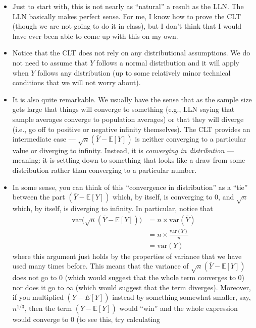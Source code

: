 \documentclass[
  letterpaper,
  DIV=11,
  numbers=noendperiod]{scrreprt}
\begin{document}
\begin{itemize}
\item
  Just to start with, this is not nearly as ``natural'' a result as the
  LLN. The LLN basically makes perfect sense. For me, I know how to
  prove the CLT (though we are not going to do it in class), but I don't
  think that I would have ever been able to come up with this on my own.
\item
  Notice that the CLT does not rely on any distributional assumptions.
  We do not need to assume that \(Y\) follows a normal distribution and
  it will apply when \(Y\) follows any distribution (up to some
  relatively minor technical conditions that we will not worry about).
\item
  It is also quite remarkable. We usually have the sense that as the
  sample size gets large that things will converge to something (e.g.,
  LLN saying that sample averages converge to population averages) or
  that they will diverge (i.e., go off to positive or negative infinity
  themselves). The CLT provides an intermediate case ---
  \(\sqrt{n}(\bar{Y} - \mathbb{E}[Y])\) is neither converging to a
  particular value or diverging to infinity. Instead, it is
  \emph{converging in distribution} --- meaning: it is settling down to
  something that looks like a draw from some distribution rather than
  converging to a particular number.
\item
  In some sense, you can think of this ``convergence in distribution''
  as a ``tie'' between the part \((\bar{Y}-\mathbb{E}[Y])\) which, by
  itself, is converging to 0, and \(\sqrt{n}\) which, by itself, is
  diverging to infinity. In particular, notice that \begin{align*}
  \mathrm{var}\Big( \sqrt{n} (\bar{Y} - \mathbb{E}[Y]) \Big) &= n \times \mathrm{var}(\bar{Y}) \\
  &= n \times \frac{\mathrm{var}(Y)}{n} \\
  &= \mathrm{var}(Y)
  \end{align*} where this argument just holds by the properties of
  variance that we have used many times before. This means that the
  variance of \(\sqrt{n}(\bar{Y}-\mathbb{E}[Y])\) does not go to 0
  (which would suggest that the whole term converges to 0) nor does it
  go to \(\infty\) (which would suggest that the term diverges).
  Moreover, if you multiplied \((\bar{Y}-E[Y])\) instead by something
  somewhat smaller, say, \(n^{1/3}\), then the term
  \((\bar{Y}-\mathbb{E}[Y])\) would ``win'' and the whole expression
  would converge to 0 (to see this, try calculating

\end{itemize}
\end{document}
